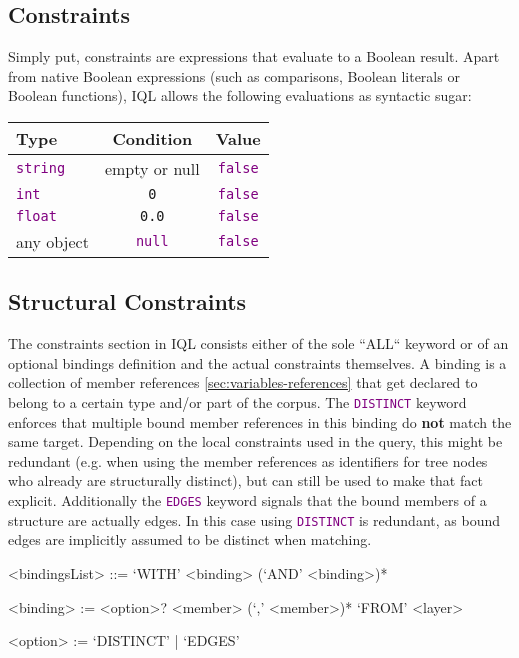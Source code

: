 \documentclass[11pt]{article}
\newcommand{\iql}{IQL\xspace}
\newcommand{\keyword}[1]{\textcolor{purple}{\texttt{#1}}}
\begin{document}
\subsection{Constraints}
\label{sec:constraints}

Simply put, constraints are expressions that evaluate to a Boolean result. Apart from native Boolean expressions (such as comparisons, Boolean literals or Boolean functions), \iql allows the following evaluations as syntactic sugar:

\noindent\begin{tabular}{|l|c|c|}
	\hline 
	Type & Condition & Value \\ 
	\hline 
	\keyword{string} & empty or null & \keyword{false}  \\ 
	\hline 
	\keyword{int} & \texttt{0} & \keyword{false} \\ 
	\hline 
	\keyword{float} & \texttt{0.0} & \keyword{false} \\ 
	\hline
	any object & \keyword{null} & \keyword{false} \\ 
	\hline 
\end{tabular}

\subsection{Structural Constraints}
\label{sec:structural-constraints}

The constraints section in \iql consists either of the sole ``ALL`` keyword or of an optional bindings definition and the actual constraints themselves. 
A binding is a collection of member references \cref{sec:variables-references} that get declared to belong to a certain type and/or part of the corpus. 
The \keyword{DISTINCT} keyword enforces that multiple bound member references in this binding do \textbf{not} match the same target. 
Depending on the local constraints used in the query, this might be redundant (e.g. when using the member references as identifiers for tree nodes who already are structurally distinct), but can still be used to make that fact explicit. 
Additionally the \keyword{EDGES} keyword signals that the bound members of a structure are actually edges.
In this case using \keyword{DISTINCT} is redundant, as bound edges are implicitly assumed to be distinct when matching.

\begin{grammar}	
	<bindingsList> ::= `WITH' <binding> (`AND' <binding>)* 
	
	<binding> := <option>? <member> (`,' <member>)* `FROM' <layer>
	
	<option> := `DISTINCT' | `EDGES'
\end{grammar}
\end{document}
